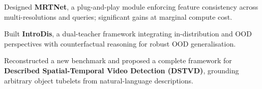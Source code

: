   \cvListStart
    \item Designed \textbf{MRTNet}, a plug-and-play module enforcing feature consistency across multi-resolutions and queries; significant gains at marginal compute cost.
    \item Built \textbf{IntroDis}, a dual-teacher framework integrating in-distribution and OOD perspectives with counterfactual reasoning for robust OOD generalisation.
    \item Reconstructed a new benchmark and proposed a complete framework for \textbf{Described Spatial-Temporal Video Detection (DSTVD)}, grounding arbitrary object tubelets from natural-language descriptions.
  \cvListEnd

\cvBlockEnd
